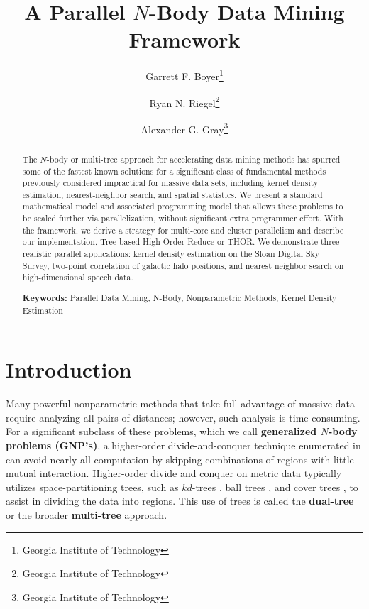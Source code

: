 \documentclass[twoside,leqno,twocolumn]{article}
\newcommand{\defterm}[1]{{\bf #1}}
\begin{document}
\title{A Parallel $N$-Body Data Mining Framework}

\author{
Garrett F. Boyer\thanks{Georgia Institute of Technology}
\and
Ryan N. Riegel\thanks{Georgia Institute of Technology}
\and
Alexander G. Gray\thanks{Georgia Institute of Technology}
}
\date{}
\maketitle
\thispagestyle{empty}

\begin{abstract} \small\baselineskip=9pt
The $N$-body or multi-tree approach for accelerating data mining methods has spurred some of the fastest known solutions for a significant class of fundamental methods previously considered impractical for massive data sets, including kernel density estimation, nearest-neighbor search, and spatial statistics.
We present a standard mathematical model and associated programming model that allows these problems to be scaled further via parallelization, without significant extra programmer effort.
With the framework, we derive a strategy for multi-core and cluster parallelism and describe our implementation, Tree-based High-Order Reduce or THOR.
We demonstrate three realistic parallel applications: kernel density estimation on the Sloan Digital Sky Survey, two-point correlation of galactic halo positions, and nearest neighbor search on high-dimensional speech data.

{\bf Keywords:} Parallel Data Mining, N-Body, Nonparametric Methods, Kernel Density Estimation
\end{abstract}

\section{Introduction}

Many powerful nonparametric methods that take full advantage of massive data require analyzing all pairs of distances; however, such analysis is time consuming.
For a significant subclass of these problems, which we call \defterm{generalized $N$-body problems (GNP's)}, a higher-order divide-and-conquer technique enumerated in \cite{gray_nbody} can avoid nearly all computation by skipping combinations of regions with little mutual interaction.
Higher-order divide and conquer on metric data typically utilizes space-partitioning trees, such as $kd$-trees \cite{preparata_kdtrees}, ball trees \cite{anchors_balltrees_moore}, and cover trees \cite{covertrees}, to assist in dividing the data into regions.
This use of trees is called the \defterm{dual-tree} or the broader \defterm{multi-tree} approach.
\end{document}
